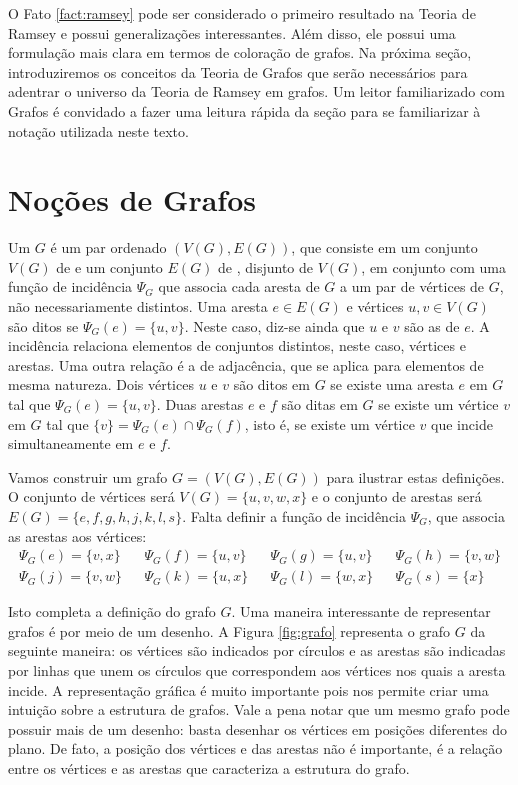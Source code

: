 O Fato \ref{fact:ramsey} pode ser considerado o primeiro resultado na Teoria de Ramsey e possui generalizações interessantes. Além disso, ele possui uma formulação mais clara em termos de coloração de grafos. Na próxima seção, introduziremos os conceitos da Teoria de Grafos que serão necessários para adentrar o universo da Teoria de Ramsey em grafos. Um leitor familiarizado com Grafos é convidado a fazer uma leitura rápida da seção para se familiarizar à notação utilizada neste texto.


\section{Noções de Grafos}

Um  $G$ é um par ordenado $(V(G), E(G))$, que consiste em um conjunto $V(G)$ de  e um conjunto $E(G)$ de , disjunto de $V(G)$, em conjunto com uma função de incidência $\Psi_G$ que associa cada aresta de $G$ a um par de vértices de $G$, não necessariamente distintos.
Uma aresta $e \in E(G)$ e vértices $u, v \in V(G)$ são ditos  se $\Psi_G(e) = \{u,v\}$. Neste caso, diz-se ainda que $u$ e $v$ são as  de $e$. A incidência relaciona elementos de conjuntos distintos, neste caso, vértices e arestas.
Uma outra relação é a de adjacência, que se aplica para elementos de mesma natureza. Dois vértices $u$ e $v$ são ditos  em $G$ se existe uma aresta $e$ em $G$ tal que $\Psi_G(e) = \{u,v\}$. Duas arestas $e$ e $f$ são ditas  em $G$ se existe um vértice $v$ em $G$ tal que $\{v\} = \Psi_G(e) \cap \Psi_G(f)$, isto é, se existe um vértice $v$ que incide simultaneamente em $e$ e $f$.

Vamos construir um grafo $G = (V(G), E(G))$ para ilustrar estas definições. O conjunto de vértices será $V(G) = \{u,v,w,x\}$ e o conjunto de arestas será $E(G) = \{e, f, g, h, j, k, l, s\}$. Falta definir a função de incidência $\Psi_G$, que associa as arestas aos vértices:
\begin{align*}
\Psi_G(e) = \{v,x\} & &
\Psi_G(f) = \{u,v\} & &
\Psi_G(g) = \{u,v\} & &
\Psi_G(h) = \{v,w\} \\
\Psi_G(j) = \{v,w\} & &
\Psi_G(k) = \{u,x\} & &
\Psi_G(l) = \{w,x\} & &
\Psi_G(s) = \{x\}
\end{align*}

Isto completa a definição do grafo $G$. Uma maneira interessante de representar grafos é por meio de um desenho. A Figura \ref{fig:grafo} representa o grafo $G$ da seguinte maneira: os vértices são indicados por círculos e as arestas são indicadas por linhas que unem os círculos que correspondem aos vértices nos quais a aresta incide. A representação gráfica é muito importante pois nos permite criar uma intuição sobre a estrutura de grafos. Vale a pena notar que um mesmo grafo pode possuir mais de um desenho: basta desenhar os vértices em posições diferentes do plano. De fato, a posição dos vértices e das arestas não é importante, é a relação entre os vértices e as arestas que caracteriza a estrutura do grafo.

